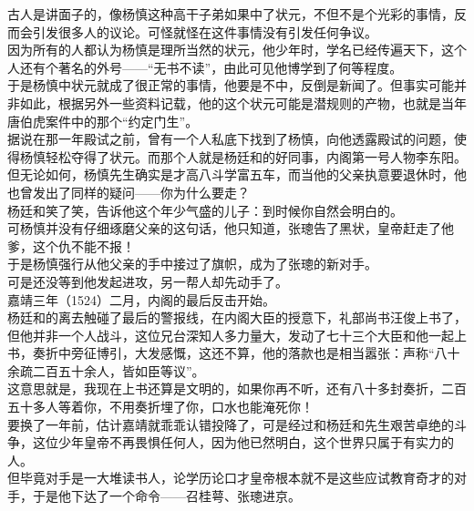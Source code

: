 \begin{multicols}{\theparacolNo}
古人是讲面子的，像杨慎这种高干子弟如果中了状元，不但不是个光彩的事情，反而会引发很多人的议论。可怪就怪在这件事情没有引发任何争议。\\

因为所有的人都认为杨慎是理所当然的状元，他少年时，学名已经传遍天下，这个人还有个著名的外号——“无书不读”，由此可见他博学到了何等程度。\\

于是杨慎中状元就成了很正常的事情，他要是不中，反倒是新闻了。但事实可能并非如此，根据另外一些资料记载，他的这个状元可能是潜规则的产物，也就是当年唐伯虎案件中的那个“约定门生”。\\

据说在那一年殿试之前，曾有一个人私底下找到了杨慎，向他透露殿试的问题，使得杨慎轻松夺得了状元。而那个人就是杨廷和的好同事，内阁第一号人物李东阳。\\

但无论如何，杨慎先生确实是才高八斗学富五车，而当他的父亲执意要退休时，他也曾发出了同样的疑问——你为什么要走？\\

杨廷和笑了笑，告诉他这个年少气盛的儿子：到时候你自然会明白的。\\

可杨慎并没有仔细琢磨父亲的这句话，他只知道，张璁告了黑状，皇帝赶走了他爹，这个仇不能不报！\\

于是杨慎强行从他父亲的手中接过了旗帜，成为了张璁的新对手。\\

可是还没等到他发起进攻，另一帮人却先动手了。\\

嘉靖三年（1524）二月，内阁的最后反击开始。\\

杨廷和的离去触碰了最后的警报线，在内阁大臣的授意下，礼部尚书汪俊上书了，但他并非一个人战斗，这位兄台深知人多力量大，发动了七十三个大臣和他一起上书，奏折中旁征博引，大发感慨，这还不算，他的落款也是相当嚣张：声称“八十余疏二百五十余人，皆如臣等议”。\\

这意思就是，我现在上书还算是文明的，如果你再不听，还有八十多封奏折，二百五十多人等着你，不用奏折埋了你，口水也能淹死你！\\

要换了一年前，估计嘉靖就乖乖认错投降了，可是经过和杨廷和先生艰苦卓绝的斗争，这位少年皇帝不再畏惧任何人，因为他已然明白，这个世界只属于有实力的人。\\

但毕竟对手是一大堆读书人，论学历论口才皇帝根本就不是这些应试教育奇才的对手，于是他下达了一个命令——召桂萼、张璁进京。\\


\end{multicols}

